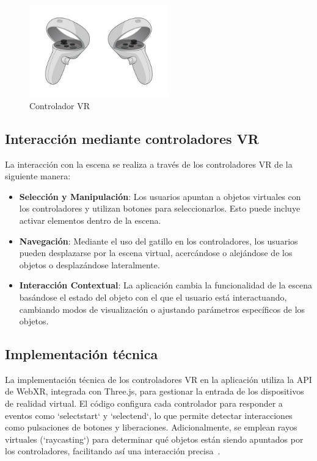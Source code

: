 \documentclass[a4paper, 12pt]{book}
\begin{document}
\begin{figure}
  \centering
  \includegraphics[width=6cm, keepaspectratio]{img/controlador.png}
  \caption{Controlador VR}
  \label{fig:controlador}
\end{figure}


\subsection{Interacción mediante controladores VR}
\label{subsec:interaccion_controladores_vr}

La interacción con la escena se realiza a través de los controladores VR de la siguiente manera:

\begin{itemize}
  \item \textbf{Selección y Manipulación}: Los usuarios apuntan a objetos virtuales con los controladores y utilizan 
  botones para seleccionarlos. Esto puede incluye activar elementos dentro de la escena.
  \item \textbf{Navegación}: Mediante el uso del gatillo en los controladores, 
  los usuarios pueden desplazarse por la escena virtual, acercándose o alejándose de los objetos o desplazándose lateralmente.
  \item \textbf{Interacción Contextual}: La aplicación cambia la funcionalidad de la escena 
  basándose el estado del objeto con el que el usuario está interactuando, 
  cambiando modos de visualización o ajustando parámetros específicos de los objetos.
\end{itemize}

\subsection{Implementación técnica}
\label{subsec:implementacion_tecnica_vr}

La implementación técnica de los controladores VR en la aplicación utiliza la API de WebXR, integrada con Three.js, para gestionar la entrada 
de los dispositivos de realidad virtual. El código configura cada controlador para responder a eventos como `selectstart` y `selectend`, 
lo que permite detectar interacciones como pulsaciones de botones y liberaciones. Adicionalmente, se emplean rayos virtuales (`raycasting`) 
para determinar qué objetos están siendo apuntados por los controladores, facilitando así una interacción precisa~\cite{Using_a_WebXR_controller_using_Three.JS}.
\end{document}
